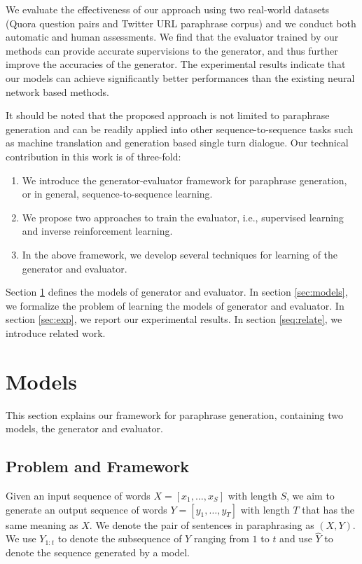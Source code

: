 \documentclass[11pt,a4paper]{article}
\begin{document}
We evaluate the effectiveness of our approach using two real-world datasets (Quora question pairs and Twitter URL
paraphrase corpus) and we conduct both automatic and human assessments. We find that the evaluator trained by our methods can provide accurate supervisions to the generator, and thus further improve the accuracies of the generator. The experimental results indicate that our models can achieve significantly better performances than the existing neural network based methods.

It should be noted that the proposed approach is not limited to paraphrase generation and can be readily applied into other sequence-to-sequence tasks such as machine translation and generation based single turn dialogue. Our technical contribution in this work is of three-fold:

\begin{enumerate}[leftmargin=*, topsep=-0.1pt]
\setlength{\itemsep}{0pt}
\setlength{\parskip}{0pt}
\item We introduce the generator-evaluator framework for paraphrase generation, or in general, sequence-to-sequence learning.
\item We propose two approaches to train the evaluator, i.e., supervised learning and inverse reinforcement learning.
\item In the above framework, we develop several techniques for learning of the generator and evaluator.
\end{enumerate}

Section \ref{sec:bg} defines the models of generator and evaluator. In section \ref{sec:models}, we formalize the problem of learning the models of generator and evaluator. In section \ref{sec:exp}, we report our experimental results. In section \ref{seq:relate}, we introduce related work.


\section{Models}\label{sec:bg}

This section explains our framework for paraphrase generation, containing two models, the generator and evaluator.

\subsection{Problem and Framework}
Given an input sequence of words $X=[x_1,\ldots,x_S]$ with length $S$, we aim to generate an output sequence of words $Y=[y_1,\ldots,y_T]$ with length $T$ that has the same meaning as $X$. We denote the pair of sentences in paraphrasing as $(X, Y)$. We use $Y_{1:t}$ to denote the subsequence of $Y$ ranging from $1$ to $t$ and use $\hat{Y}$ to denote the sequence generated by a model.
\end{document}
